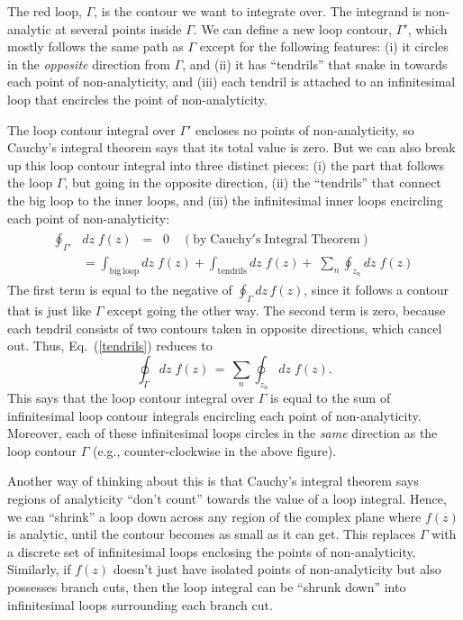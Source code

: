 \documentclass[10pt,a4paper]{article}
\begin{document}
\noindent
The red loop, $\Gamma$, is the contour we want to integrate over. The
integrand is non-analytic at several points inside $\Gamma$. We can
define a new loop contour, $\Gamma'$, which mostly follows the same
path as $\Gamma$ except for the following features: (i) it circles in
the \emph{opposite} direction from $\Gamma$, and (ii) it has
``tendrils'' that snake in towards each point of non-analyticity, and
(iii) each tendril is attached to an infinitesimal loop that encircles
the point of non-analyticity.

The loop contour integral over $\Gamma'$ encloses no points of
non-analyticity, so Cauchy's integral theorem says that its total
value is zero. But we can also break up this loop contour integral
into three distinct pieces: (i) the part that follows the loop
$\Gamma$, but going in the opposite direction, (ii) the ``tendrils''
that connect the big loop to the inner loops, and (iii) the
infinitesimal inner loops encircling each point of non-analyticity:
\begin{align}
  \begin{aligned}
  \oint_{\Gamma'}& dz\; f(z)
  \;\;= \;\; 0 \quad (\mathrm{by}\;\mathrm{Cauchy's}\;\mathrm{Integral}\;\mathrm{Theorem}) \\
  &= \int_{\mathrm{big}\,\mathrm{loop}} dz\; f(z) + \int_{\mathrm{tendrils}} dz\; f(z)
  +\; \sum_n \oint_{z_n} dz\; f(z)
  \end{aligned}
  \label{tendrils}
\end{align}
The first term is equal to the negative of $\oint_\Gamma dz \, f(z)$,
since it follows a contour that is just like $\Gamma$ except going the
other way. The second term is zero, because each tendril consists of
two contours taken in opposite directions, which cancel out. Thus,
Eq.~(\ref{tendrils}) reduces to
\begin{equation}
  \oint_\Gamma dz\; f(z) \,=\, \sum_n \oint_{z_n} dz\; f(z).
\end{equation}
This says that the loop contour integral over $\Gamma$ is equal to the
sum of infinitesimal loop contour integrals encircling each point of
non-analyticity. Moreover, each of these infinitesimal loops circles
in the \emph{same} direction as the loop contour $\Gamma$ (e.g.,
counter-clockwise in the above figure).

Another way of thinking about this is that Cauchy's integral theorem
says regions of analyticity ``don't count'' towards the value of a
loop integral. Hence, we can ``shrink'' a loop down across any region
of the complex plane where $f(z)$ is analytic, until the contour
becomes as small as it can get. This replaces $\Gamma$ with a discrete
set of infinitesimal loops enclosing the points of
non-analyticity. Similarly, if $f(z)$ doesn't just have isolated
points of non-analyticity but also possesses branch cuts, then the
loop integral can be ``shrunk down'' into infinitesimal loops
surrounding each branch cut.
\end{document}
